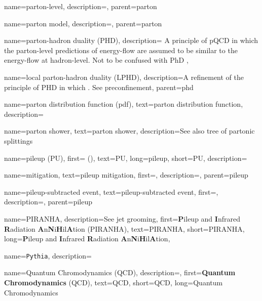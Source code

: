     {
      name=parton-level,
      description={},
      parent=parton
    }

    {
      name=parton model,
      description={},
      parent=parton
    }


{
  name=parton-hadron duality (PHD),
  description={
      A principle of pQCD in which the parton-level predictions of energy-flow are assumed to be similar to the energy-flow at hadron-level.
      Not to be confused with PhD 
  },
}

    {
      name=local parton-hadron duality (LPHD),
      description={A refinement of the principle of PHD in which \sam{}.
      See preconfinement},
      parent=phd
    }




{
  name=parton distribution function (pdf),
  text=parton distribution function,
  description={}
}



{
  name=parton shower,
  text=parton shower,
  description={See also tree of partonic splittings}
}


{
  name=pileup (PU),
  first= (),
  text=PU,
  long=pileup,
  short=PU,
  description={}
}

    {
      name=mitigation,
      text=pileup mitigation,
      first=,
      description={},
      parent=pileup
    }

    {
      name=pileup-subtracted event,
      text=pileup-subtracted event,
      first=,
      description={},
      parent=pileup
    }

{
    name=PIRANHA,
    description={See jet grooming},
    first={\textbf{P}ileup and \textbf{I}nfrared \textbf{R}adiation \textbf{A}n\textbf{N}i\textbf{H}il\textbf{A}tion (PIRANHA)},
    text={PIRANHA},
    short={PIRANHA},
    long={\textbf{P}ileup and \textbf{I}nfrared \textbf{R}adiation \textbf{A}n\textbf{N}i\textbf{H}il\textbf{A}tion},
}


{
  name=\texttt{Pythia},
  description={}
}

{
    name=Quantum Chromodynamics (QCD),
    description={},
    first={\textbf{Quantum Chromodynamics} (QCD)},
    text={QCD},
    short={QCD},
    long={Quantum Chromodynamics}
}


